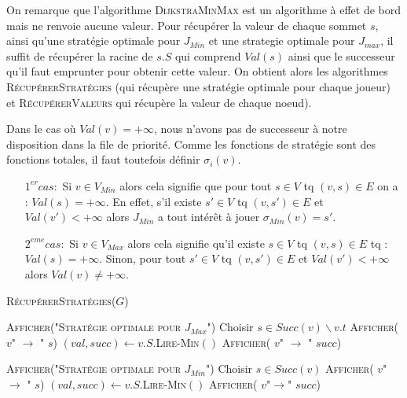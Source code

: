 \FloatBarrier




On remarque que l'algorithme \textsc{DijkstraMinMax}  est un algorithme à effet de bord mais ne renvoie aucune valeur. Pour récupérer la valeur de chaque sommet $s$, ainsi qu'une stratégie optimale pour $J_{Min}$ et une strategie optimale pour $J_{max}$, il suffit de récupérer la racine de $s.S$ qui comprend $Val(s)$ ainsi que le successeur qu'il faut emprunter pour obtenir cette valeur. On obtient alors les algorithmes \textsc{RécupérerStratégies} (qui récupère une stratégie optimale pour chaque joueur) et \textsc{RécupérerValeurs} qui récupère la valeur de chaque noeud).

\begin{rem}
	
	Dans le cas où $Val(v) = +\infty$, nous n'avons pas de successeur à notre disposition dans la file de priorité. Comme les fonctions de stratégie sont des fonctions totales, il faut toutefois définir $\sigma _{i} (v)$.
\begin{enumerate}
	\item[$1^{er} cas:$] Si $v \in V_{Min}$ alors cela signifie que pour tout $s \in V$ tq $(v,s) \in E$ on a : $Val(s) = +\infty$. En effet, s'il existe $s' \in V$ tq $(v,s')\in E$ et $Val(v') < +\infty$ alors $J_{Min}$ a tout intérêt à jouer $\sigma _{Min}(v) = s'$.
	\item[$2^{eme} cas:$] Si $v \in V_{Max}$ alors cela signifie qu'il existe $s \in V$ tq $(v,s) \in E$ tq : $Val(s) = +\infty$. Sinon, pour tout $s' \in V$ tq $(v,s') \in E$ et $Val(v') < +\infty$ alors $Val(v) \neq +\infty$. 
	
\end{enumerate}

\end{rem}

\begin{algorithm}
	\caption{\textsc{RécupérerStratégies}($G$)}
	\label{algo:recupStrat}
	\begin{algorithmic}[1]
	
	\STATE \textsc{Afficher("Stratégie optimale pour $J_{Max}$")}
			\STATE Choisir $s \in Succ(v) \backslash v.t$
			\STATE \textsc{Afficher( $v$" $\rightarrow $ " $s$)}
		\ELSE
			\STATE $(val,succ) \leftarrow v.S.$\textsc{Lire-Min}$()$
			\STATE \textsc{Afficher( $v$" $\rightarrow$ " $succ$)}
		\ENDIF
	\ENDFOR
	
	\STATE \textsc{Afficher("Stratégie optimale pour $J_{Min}$")}
			\STATE Choisir $s \in Succ(v)$
			\STATE \textsc{Afficher( $v$" $ \rightarrow$ " $s$)}
		\ELSE	
			\STATE $(val,succ) \leftarrow v.S.$\textsc{Lire-Min}$()$
			\STATE \textsc{Afficher( $v $"$ \rightarrow $" $succ$)}
		\ENDIF
	\ENDFOR
	
	\end{algorithmic}
\end{algorithm}

